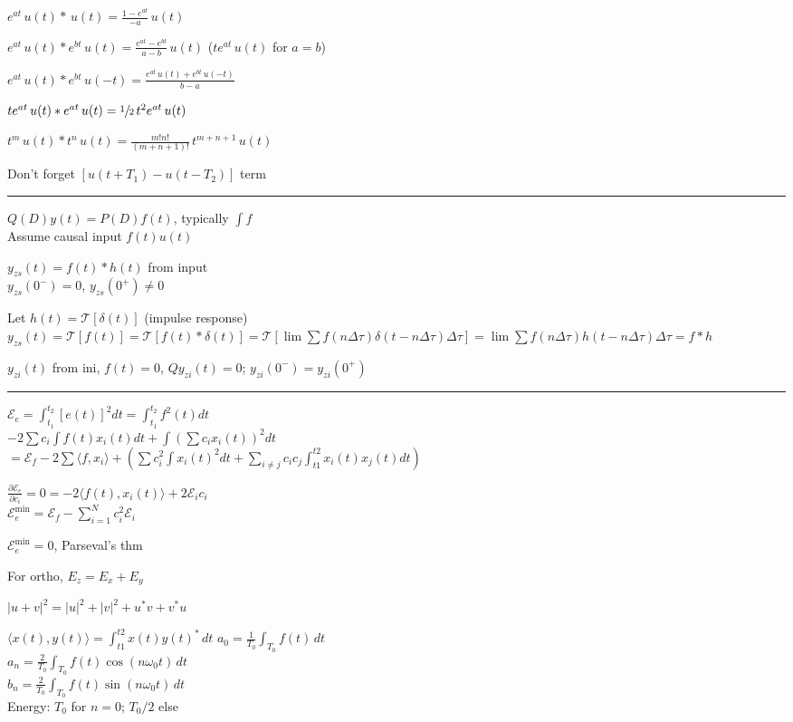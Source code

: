 \documentclass[6pt]{article}
\theoremstyle{definition}
\theoremstyle{definition}
\begin{document}
\begin{multicols*}{3}
    $e^{at} \,u(t)* \,u(t) = \frac{1-e^{at}}{-a}\, u(t)$

    $e^{at}\,u(t) * e^{bt}\,u(t) = \frac{e^{at} - e^{bt}}{a - b}\, u(t)$ ($te^{at} \, u(t)$ for $a=b$) 

    $e^{at}\, u(t) * e^{bt} \,u(-t) = \frac{e^{at} \, u(t) + e^{bt} \, u(-t)}{b-a}$

    $te^{at}\,u(t) * e^{at} \,u(t)= \sfrac{1}{2} \,t^2e^{at} \, u(t)$

    $t^m\, u(t) * t^n \, u(t) = \frac{m!n!}{(m+n+1)!}\, t^{m+n+1} \, u(t)$

    Don't forget $[u(t+T_1) - u(t-T_2)]$ term
\rule{\linewidth}{0.5pt}
    $Q(D) y(t) = P(D) f(t)$, typically $\int f$\\
    Assume causal input $f(t) u(t)$

    $y_{zs}(t) = f(t) * h(t)$ from input\\    
        $y_{zs}(0^-) = 0$, $y_{zs}(0^+) \neq 0$

        Let $h(t) = \mathcal{T} [\delta (t)]$ (impulse response)
            $y_{zs}(t)=\mathcal{T} [f(t)] = \mathcal{T} [f(t) * \delta (t)] =
            \mathcal{T}[\lim\sum f(n\Delta\tau) \delta(t - n\Delta\tau) \Delta\tau] =
            \lim\sum f(n\Delta\tau) h(t-n\Delta\tau)\Delta\tau = f * h$
            
        $y_{zi}(t)$ from ini, $f(t)=0$,
            $Q y_{zi}(t) = 0$;
            $y_{zi}(0^-) = y_{zi}(0^+)$
\rule{\linewidth}{0.5pt}
    $\mathcal{E}_e = \int_{t_1}^{t_2} [e(t)]^2 dt = \int_{t_1}^{t_2} f^2(t)dt$\\
    $- 2\sum c_i \int f(t) x_i(t) dt + \int (\sum c_i x_i(t))^2 dt$\\
    $    = \mathcal{E}_f
    -  2\sum \langle f, x_i \rangle +
    (\sum c_i^2 \int x_i(t)^2 dt + \sum_{i\neq j} c_i c_j \int_{t1}^{t2} x_i(t) x_j(t) dt)$
        
    $\frac{\partial \mathcal{E}_e}{\partial c_i} = 0 = -2 \langle f(t), x_i(t)\rangle + 2\mathcal{E}_i c_i$\\
    $\mathcal{E}_e^{\text{min}} = \mathcal{E}_f - \sum_{i=1}^N c_i^2 \mathcal{E}_i$

    $\mathcal{E}^\mathrm{min}_e = 0$, Parseval's thm

    For ortho, $E_z = E_x + E_y$
        

    $|u+v|^2 = |u|^2 + |v|^2 + u^*v + v^*u$

    $\langle x(t), y(t)\rangle = \int_{t1}^{t2} x(t) y(t)^* \, dt$
\vfill\null
\columnbreak 
    $a_0 = \frac{1}{T_0} \int_{T_0} f(t)\, dt$\\
    $a_n = \frac{2}{T_0} \int_{T_0} f(t) \cos(n\omega_0t)\,dt$\\
    $b_n = \frac{2}{T_0} \int_{T_0} f(t) \sin(n\omega_0t)\,dt$\\
    Energy: $T_0$ for $n=0$; $T_0/2$ else
     

\end{multicols*}
\end{document}

